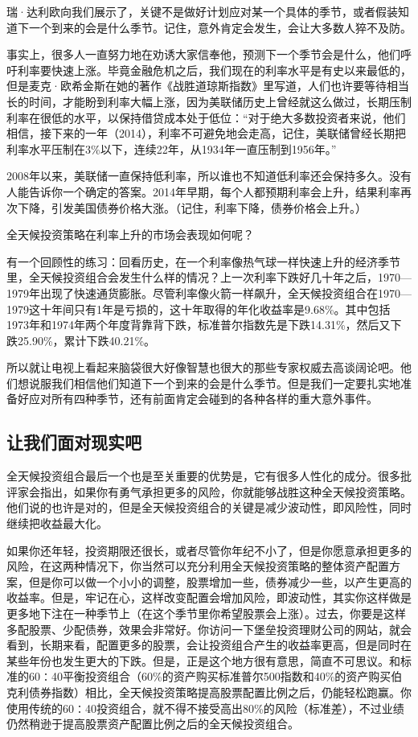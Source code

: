 瑞·达利欧向我们展示了，关键不是做好计划应对某一个具体的季节，或者假装知道下一个到来的会是什么季节。记住，意外肯定会发生，会让大多数人猝不及防。

事实上，很多人一直努力地在劝诱大家信奉他，预测下一个季节会是什么，他们呼吁利率要快速上涨。毕竟金融危机之后，我们现在的利率水平是有史以来最低的，但是麦克·欧希金斯在她的著作《战胜道琼斯指数》里写道，人们也许要等待相当长的时间，才能盼到利率大幅上涨，因为美联储历史上曾经就这么做过，长期压制利率在很低的水平，以保持借贷成本处于低位：“对于绝大多数投资者来说，他们相信，接下来的一年（2014），利率不可避免地会走高，记住，美联储曾经长期把利率水平压制在3\%以下，连续22年，从1934年一直压制到1956年。”

2008年以来，美联储一直保持低利率，所以谁也不知道低利率还会保持多久。没有人能告诉你一个确定的答案。2014年早期，每个人都预期利率会上升，结果利率再次下降，引发美国债券价格大涨。（记住，利率下降，债券价格会上升。）

全天候投资策略在利率上升的市场会表现如何呢？

有一个回顾性的练习：回看历史，在一个利率像热气球一样快速上升的经济季节里，全天候投资组合会发生什么样的情况？上一次利率下跌好几十年之后，1970—1979年出现了快速通货膨胀。尽管利率像火箭一样飙升，全天候投资组合在1970—1979这十年间只有1年是亏损的，这十年取得的年化收益率是9.68\%。其中包括1973年和1974年两个年度背靠背下跌，标准普尔指数先是下跌14.31\%，然后又下跌25.90\%，累计下跌40.21\%。

所以就让电视上看起来脑袋很大好像智慧也很大的那些专家权威去高谈阔论吧。他们想说服我们相信他们知道下一个到来的会是什么季节。但是我们一定要扎实地准备好应对所有四种季节，还有前面肯定会碰到的各种各样的重大意外事件。

\subsection{让我们面对现实吧}

全天候投资组合最后一个也是至关重要的优势是，它有很多人性化的成分。很多批评家会指出，如果你有勇气承担更多的风险，你就能够战胜这种全天候投资策略。他们说的也许是对的，但是全天候投资组合的关键是减少波动性，即风险性，同时继续把收益最大化。

如果你还年轻，投资期限还很长，或者尽管你年纪不小了，但是你愿意承担更多的风险，在这两种情况下，你当然可以充分利用全天候投资策略的整体资产配置方案，但是你可以做一个小小的调整，股票增加一些，债券减少一些，以产生更高的收益率。但是，牢记在心，这样改变配置会增加风险，即波动性，其实你这样做是更多地下注在一种季节上（在这个季节里你希望股票会上涨）。过去，你要是这样多配股票、少配债券，效果会非常好。你访问一下堡垒投资理财公司的网站，就会看到，长期来看，配置更多的股票，会让投资组合产生的收益率更高，但是同时在某些年份也发生更大的下跌。但是，正是这个地方很有意思，简直不可思议。和标准的60∶40平衡投资组合（60\%的资产购买标准普尔500指数和40\%的资产购买伯克利债券指数）相比，全天候投资策略提高股票配置比例之后，仍能轻松跑赢。你使用传统的60∶40投资组合，就不得不接受高出80\%的风险（标准差），不过业绩仍然稍逊于提高股票资产配置比例之后的全天候投资组合。

